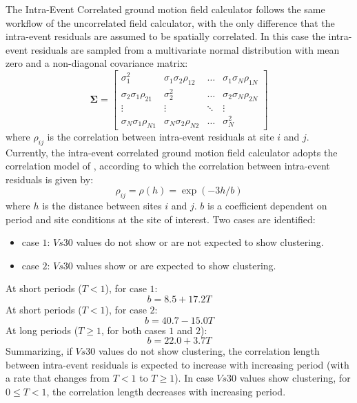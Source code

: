 The Intra-Event Correlated ground motion field calculator follows the same workflow of the uncorrelated field calculator, with the only difference that the intra-event residuals are assumed to be spatially correlated. In this case the intra-event residuals are sampled from a multivariate normal distribution with mean zero and a non-diagonal covariance matrix:
\begin{equation}
\bm{\Sigma}=
\begin{bmatrix}
\sigma^{2}_{1} &  \sigma_{1}\sigma_{2}\rho_{12}  & \ldots &  \sigma_{1}\sigma_{N}\rho_{1N}\\
\sigma_{2}\sigma_{1}\rho_{21}  &  \sigma^{2}_{2} & \ldots &  \sigma_{2}\sigma_{N}\rho_{2N}\\
\vdots & \vdots & \ddots & \vdots\\
\sigma_{N}\sigma_{1}\rho_{N1}  &   \sigma_{N}\sigma_{2}\rho_{N2}       &\ldots & \sigma^{2}_{N}
\end{bmatrix}
\end{equation}
where $\rho_{ij}$ is the correlation between intra-event residuals at site $i$ and $j$.\\
Currently, the intra-event correlated ground motion field calculator adopts the correlation model of \citet{jayaram2009}, according to which the correlation between intra-event residuals is given by:
 \begin{equation}
 \rho_{ij} = \rho(h) = \exp(-3h/b)
 \end{equation}
 where $h$ is the distance between sites $i$ and $j$. $b$ is a coefficient dependent on period and site conditions at the site of interest. Two cases are identified:
 \begin{itemize}
 \item case $1$:  $Vs30$ values do not show or are not expected to show clustering.
 \item case $2$: $Vs30$ values show or are expected to show clustering.
 \end{itemize}
At short periods ($T<1$), for case $1$:
\begin{equation}
b = 8.5 + 17.2T
\end{equation}
At short periods ($T<1$), for case $2$:
\begin{equation}
b = 40.7 - 15.0T
\end{equation}
At long periods ($T\geq1$, for both cases $1$ and $2$):
\begin{equation}
b = 22.0 + 3.7T
\end{equation}
Summarizing, if $Vs30$ values do not show clustering, the correlation length between intra-event residuals is expected to increase with increasing period (with a rate that changes from $T<1$ to $T\geq1$). In case $Vs30$ values show clustering, for  $0\leq T<1$, the correlation length decreases with increasing period.\\

